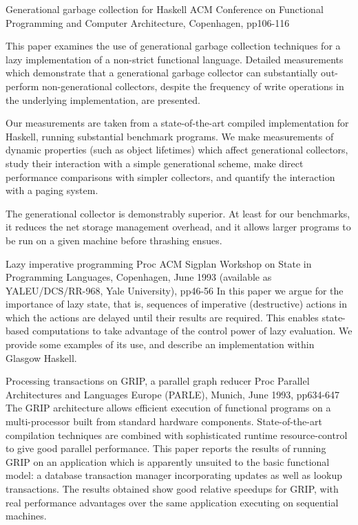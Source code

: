 {Generational garbage collection for Haskell}
{ACM Conference on Functional Programming and Computer Architecture, Copenhagen, pp106-116}
{This paper examines the use of generational garbage collection
techniques for a lazy implementation of a non-strict functional
language. Detailed measurements which demonstrate that a generational
garbage collector can substantially out-perform non-generational
collectors, despite the frequency of write operations in the
underlying implementation, are presented.

Our measurements are taken from a state-of-the-art compiled
implementation for Haskell, running substantial benchmark programs.
We make measurements of dynamic properties (such as object lifetimes)
which affect generational collectors, study their interaction with a
simple generational scheme, make direct performance comparisons with
simpler collectors, and quantify the interaction with a paging system.

The generational collector is demonstrably superior.  At least for our
benchmarks, it reduces the net storage management overhead, and it
allows larger programs to be run on a given machine before thrashing
ensues.}

{Lazy imperative programming}
{Proc ACM Sigplan Workshop on State in Programming Languages, Copenhagen, June 1993 (available as
YALEU/DCS/RR-968, Yale University), pp46-56}
{
In this paper we argue for the importance of lazy state, that is,
sequences of imperative (destructive) actions in which the actions are
delayed until their results are required. This enables state-based
computations to take advantage of the control power of lazy evaluation.
We provide some examples of its use, and describe an implementation
within Glasgow Haskell.
}

{Processing transactions on GRIP, a parallel graph reducer}
{Proc Parallel Architectures and Languages Europe (PARLE), Munich, June 1993, pp634-647}
{
The GRIP architecture allows efficient execution of functional
programs on a multi-processor built from standard hardware components.
State-of-the-art compilation techniques are combined with
sophisticated runtime resource-control to give good parallel
performance.  This paper reports the results of running GRIP on an
application which is apparently unsuited to the basic functional
model: a database transaction manager incorporating updates as well as
lookup transactions.  The results obtained show good relative speedups
for GRIP, with real performance advantages over the same application
executing on sequential machines.
}

